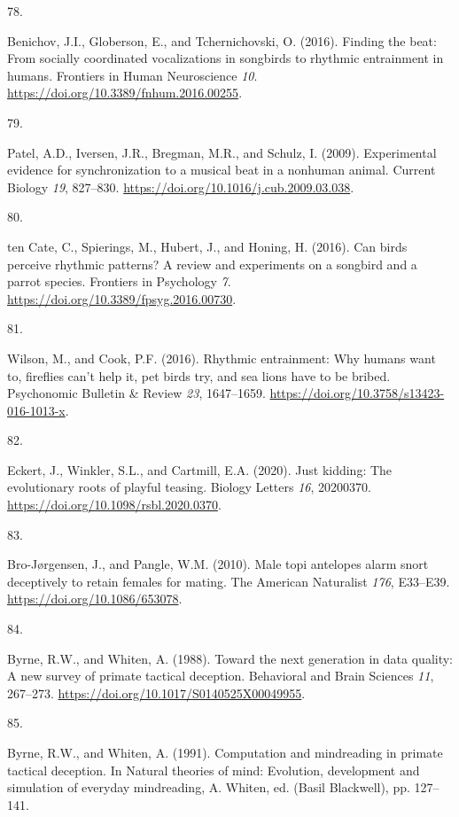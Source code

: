 \documentclass[
  man, donotrepeattitle,floatsintext]{apa6}
\newlength{\cslhangindent}
\newlength{\csllabelwidth}
\newlength{\cslentryspacingunit} %
\newenvironment{CSLReferences}[2] %
 {%
  \setlength{\parindent}{0pt}
  \ifodd #1
  \let\oldpar\par
  \def\par{\hangindent=\cslhangindent\oldpar}
  \fi
  \setlength{\parskip}{#2\cslentryspacingunit}
 }%
 {}
\newcommand{\CSLLeftMargin}[1]{\parbox[t]{\csllabelwidth}{#1}}
\newcommand{\CSLRightInline}[1]{\parbox[t]{\linewidth - \csllabelwidth}{#1}\break}
\begin{document}
\begin{CSLReferences}{0}{0}
\leavevmode{}%
\CSLLeftMargin{78. }%
\CSLRightInline{Benichov, J.I., Globerson, E., and Tchernichovski, O. (2016). Finding the beat: From socially coordinated vocalizations in songbirds to rhythmic entrainment in humans. Frontiers in Human Neuroscience \emph{10}. \url{https://doi.org/10.3389/fnhum.2016.00255}.}

\leavevmode{}%
\CSLLeftMargin{79. }%
\CSLRightInline{Patel, A.D., Iversen, J.R., Bregman, M.R., and Schulz, I. (2009). Experimental evidence for synchronization to a musical beat in a nonhuman animal. Current Biology \emph{19}, 827--830. \url{https://doi.org/10.1016/j.cub.2009.03.038}.}

\leavevmode{}%
\CSLLeftMargin{80. }%
\CSLRightInline{ten Cate, C., Spierings, M., Hubert, J., and Honing, H. (2016). Can birds perceive rhythmic patterns? A review and experiments on a songbird and a parrot species. Frontiers in Psychology \emph{7}. \url{https://doi.org/10.3389/fpsyg.2016.00730}.}

\leavevmode{}%
\CSLLeftMargin{81. }%
\CSLRightInline{Wilson, M., and Cook, P.F. (2016). Rhythmic entrainment: Why humans want to, fireflies can't help it, pet birds try, and sea lions have to be bribed. Psychonomic Bulletin \& Review \emph{23}, 1647--1659. \url{https://doi.org/10.3758/s13423-016-1013-x}.}

\leavevmode{}%
\CSLLeftMargin{82. }%
\CSLRightInline{Eckert, J., Winkler, S.L., and Cartmill, E.A. (2020). Just kidding: The evolutionary roots of playful teasing. Biology Letters \emph{16}, 20200370. \url{https://doi.org/10.1098/rsbl.2020.0370}.}

\leavevmode{}%
\CSLLeftMargin{83. }%
\CSLRightInline{Bro-Jørgensen, J., and Pangle, W.M. (2010). Male topi antelopes alarm snort deceptively to retain females for mating. The American Naturalist \emph{176}, E33--E39. \url{https://doi.org/10.1086/653078}.}

\leavevmode{}%
\CSLLeftMargin{84. }%
\CSLRightInline{Byrne, R.W., and Whiten, A. (1988). Toward the next generation in data quality: A new survey of primate tactical deception. Behavioral and Brain Sciences \emph{11}, 267--273. \url{https://doi.org/10.1017/S0140525X00049955}.}

\leavevmode{}%
\CSLLeftMargin{85. }%
\CSLRightInline{Byrne, R.W., and Whiten, A. (1991). Computation and mindreading in primate tactical deception. In Natural theories of mind: Evolution, development and simulation of everyday mindreading, A. Whiten, ed. (Basil Blackwell), pp. 127--141.}


\end{CSLReferences}
\end{document}
